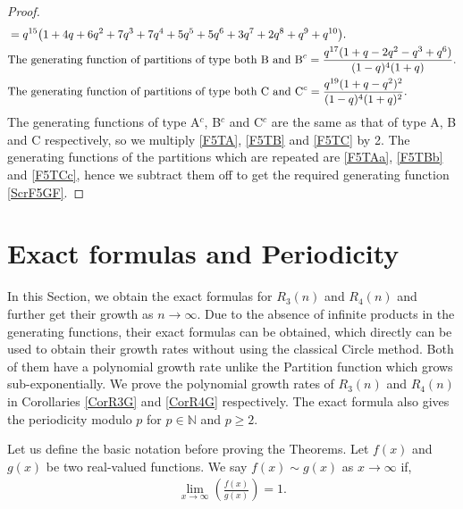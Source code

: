 \documentclass[12pt,reqno]{amsart}
\numberwithin{equation}{section}
\theoremstyle{plain}
\begin{document}
\begin{proof}
\begin{align}
				&= q^{15}\big( 1+4q+6q^2+7q^3+7q^4+5q^5+5q^6+3q^7+2q^8+q^9+q^{10} \big). \label{F5TAa}\\
				&\textup{The generating function of partitions of type both B and B}^c=   \frac{q^{17}(1+q-2q^2-q^3+q^6)}{(1-q)^4(1+q)}. \label{F5TBb}\\
				&\textup{The generating function of partitions of type both C and C}^c= \frac{q^{19}(1+q-q^2)^2}{(1-q)^4(1+q)^2}. \label{F5TCc}
		\end{align}
		The generating functions of type A$^c$, B$^c$ and C$^c$ are the same as that of type A, B and C respectively, so we multiply \eqref{F5TA}, \eqref{F5TB} and \eqref{F5TC} by 2. The generating functions of the partitions which are repeated are \eqref{F5TAa}, \eqref{F5TBb} and \eqref{F5TCc}, hence we subtract them off to get the required generating function \eqref{ScrF5GF}.
	\end{proof}
	\section{Exact formulas and Periodicity}\label{SecExa}
	In this Section, we obtain the exact formulas for $R_3(n)$ and $R_4(n)$ and further get their growth as $n \to \infty$. Due to the absence of infinite products in the generating functions, their exact formulas can be obtained, which directly can be used to obtain their growth rates without using the classical Circle method. Both of them have a polynomial growth rate unlike the Partition function which grows sub-exponentially. We prove the polynomial growth rates of $R_3(n)$ and $R_4(n)$ in Corollaries \ref{CorR3G} and \ref{CorR4G} respectively. The exact formula also gives the periodicity modulo $p$ for $p \in \mathbb{N}$ and $p\geq2$. 
	
	Let us define the basic notation before proving the Theorems. Let $f(x)$ and $g(x)$ be two real-valued functions. We say $f(x)\sim g(x)$ as $x\to \infty$ if,
	\begin{align*}
		\lim_{x\to \infty} \left(\frac{f(x)}{g(x)}\right)=1 .
	\end{align*}
	
\end{document}
